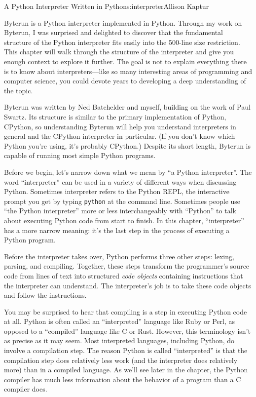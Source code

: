\begin{aosachapter}{A Python Interpreter Written in Python}{s:interpreter}{Allison Kaptur}

\label{introduction}

Byterun is a Python interpreter implemented in Python. Through my work
on Byterun, I was surprised and delighted to discover that the
fundamental structure of the Python interpreter fits easily into the
500-line size restriction. This chapter will walk through the structure
of the interpreter and give you enough context to explore it further.
The goal is not to explain everything there is to know about
interpreters---like so many interesting areas of programming and
computer science, you could devote years to developing a deep
understanding of the topic.

Byterun was written by Ned Batchelder and myself, building on the work
of Paul Swartz. Its structure is similar to the primary implementation
of Python, CPython, so understanding Byterun will help you understand
interpreters in general and the CPython interpreter in particular. (If
you don't know which Python you're using, it's probably CPython.)
Despite its short length, Byterun is capable of running most simple
Python programs.

\label{a-python-interpreter}

Before we begin, let's narrow down what we mean by ``a Python
interpreter''. The word ``interpreter'' can be used in a variety of
different ways when discussing Python. Sometimes interpreter refers to
the Python REPL, the interactive prompt you get by typing
\texttt{python} at the command line. Sometimes people use ``the Python
interpreter'' more or less interchangeably with ``Python'' to talk about
executing Python code from start to finish. In this chapter,
``interpreter'' has a more narrow meaning: it's the last step in the
process of executing a Python program.

Before the interpreter takes over, Python performs three other steps:
lexing, parsing, and compiling. Together, these steps transform the
programmer's source code from lines of text into structured \emph{code
objects} containing instructions that the interpreter can understand.
The interpreter's job is to take these code objects and follow the
instructions.

You may be surprised to hear that compiling is a step in executing
Python code at all. Python is often called an ``interpreted'' language
like Ruby or Perl, as opposed to a ``compiled'' language like C or Rust.
However, this terminology isn't as precise as it may seem. Most
interpreted languages, including Python, do involve a compilation step.
The reason Python is called ``interpreted'' is that the compilation step
does relatively less work (and the interpreter does relatively more)
than in a compiled language. As we'll see later in the chapter, the
Python compiler has much less information about the behavior of a
program than a C compiler does.


\end{aosachapter}
